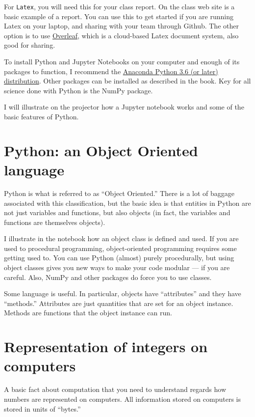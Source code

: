 For {\tt Latex}, you will need this for your class report. On the
class web site is a basic example of a report. You can use this to get
started if you are running Latex on your laptop, and sharing with your
team through Github. The other option is to use
\href{http://overleaf.com}{\color{red} Overleaf}, which is a
cloud-based Latex document system, also good for sharing.

To install Python and Jupyter Notebooks on your computer and enough of
its packages to function, I recommend the
\href{https://www.continuum.io/downloads}{\color{red} Anaconda Python
  3.6 (or later) distribution}. Other packages can be installed as
described in the book. Key for all science done with Python is the
NumPy package.

I will illustrate on the projector how a Jupyter notebook works and
some of the basic features of Python.

\section{Python: an Object Oriented language}

Python is what is referred to as ``Object Oriented.'' There is a lot
of baggage associated with this classification, but the basic idea is
that entities in Python are not just variables and functions, but also
objects (in fact, the variables and functions are themselves
objects). 

I illustrate in the notebook how an object class is defined and
used. If you are used to procedural programming, object-oriented
programming requires some getting used to. You can use Python (almost)
purely procedurally, but using object classes gives you new ways to
make your code modular --- if you are careful. Also, NumPy and other
packages do force you to use classes. 

Some language is useful. In particular, objects have ``attributes''
and they have ``methods.'' Attributes are just quantities that are set
for an object instance. Methods are functions that the object instance
can run. 

\section{Representation of integers on computers}

A basic fact about computation that you need to understand regards how
numbers are represented on computers. All information stored on
computers is stored in units of ``bytes.''

